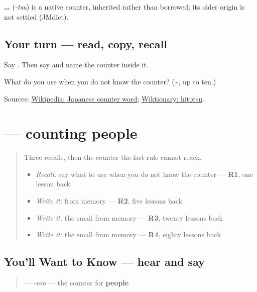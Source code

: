 \begin{cousinweb}
\textbf{…} (\emph{-tsu}) is a native counter, inherited rather than borrowed; its older origin is not settled (JMdict).
\end{cousinweb}

\subsection*{Your turn — read, copy, recall}
Say \textbf{ }. Then say \textbf{} and name the counter inside it.

\begin{tcolorbox}[breakable,colback=teal!4,colframe=teal!35!black,title={Before you move on}]
What do you use when you do not know the counter? (\textbf{\textasciitilde{}}, up to ten.)

Sources: \href{https://en.wikipedia.org/wiki/Japanese\_counter\_word}{Wikipedia: Japanese counter word}; \href{https://en.wiktionary.org/wiki/\%E4\%B8\%80\%E3\%81\%A4}{Wiktionary: hitotsu}.
\end{tcolorbox}
\section[\texorpdfstring{\ja{にん} (-nin)}{にん (-nin)}]{ — counting people}

\label{lesson:JA-C18-nin}



\begin{quote}
Three recalls, then the counter the last rule cannot reach.

\begin{itemize}
\raggedright
  \item \emph{Recall:} say what to use when you do not know the counter — \textbf{R1}, one lesson back
  \item \emph{Write it:} \textbf{} from memory — \textbf{R2}, five lessons back
  \item \emph{Write it:} the small \textbf{} from memory — \textbf{R3}, twenty lessons back
  \item \emph{Write it:} the small \textbf{} from memory — \textbf{R4}, eighty lessons back
\end{itemize}
\end{quote}

\subsection*{You'll Want to Know — hear and say}
\begin{quote}
\textbf{} — \emph{-nin} — the counter for \textbf{people}
\end{quote}

